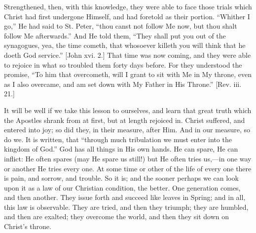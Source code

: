 Strengthened, then, with this knowledge, they were able to face
those trials which Christ had first undergone Himself, and had
foretold as their portion. ``Whither I go,'' He had said to
St. Peter, ``thou canst not follow Me now, but thou shalt follow
Me afterwards.'' And He told them, ``They shall put you out of
the synagogues, yea, the time cometh, that whosoever killeth you will
think that he doeth God service.'' [John xvi. 2.] That time was
now coming, and they were able to rejoice in what so troubled them
forty days before. For they understood the promise, ``To him that
overcometh, will I grant to sit with Me in My throne, even as I also
overcame, and am set down with My Father in His Throne.'' [Rev.
iii. 21.]

It will be well if we take this lesson to ourselves, and learn that
great truth which the Apostles shrank from at first, but at length
rejoiced in. Christ suffered, and entered into joy; so did they, in
their measure, after Him. And in our measure, so do we. It is written,
that ``through much tribulation we must enter into the kingdom of
God.'' God has all things in His own hands. He can spare, He can
inflict: He often spares (may He spare us still!) but He often tries
us,—in one way or another He tries every one. At some time or other
of the life of every one there is pain, and sorrow, and trouble. So it
is; and the sooner perhaps we can look upon it as a law of our
Christian condition, the better. One generation comes, and then
another. They issue forth and succeed like leaves in Spring; and in
all, this law is observable. They are tried, and then they triumph;
they are humbled, and then are exalted; they overcome the world, and
then they sit down on Christ's throne.


